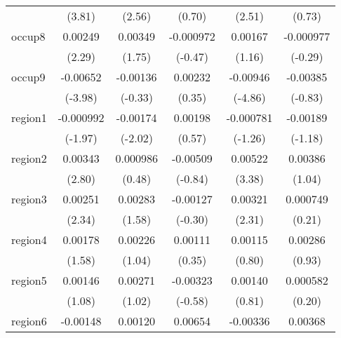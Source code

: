 \begin{table}[htbp]
\begin{tabular}{l*{5}{c}}
            &      (3.81)         &      (2.56)         &      (0.70)         &      (2.51)         &      (0.73)         \\
occup8      &     0.00249\sym{*}  &     0.00349         &   -0.000972         &     0.00167         &   -0.000977         \\
            &      (2.29)         &      (1.75)         &     (-0.47)         &      (1.16)         &     (-0.29)         \\
occup9      &    -0.00652\sym{***}&    -0.00136         &     0.00232         &    -0.00946\sym{***}&    -0.00385         \\
            &     (-3.98)         &     (-0.33)         &      (0.35)         &     (-4.86)         &     (-0.83)         \\
region1     &   -0.000992\sym{*}  &    -0.00174\sym{*}  &     0.00198         &   -0.000781         &    -0.00189         \\
            &     (-1.97)         &     (-2.02)         &      (0.57)         &     (-1.26)         &     (-1.18)         \\
region2     &     0.00343\sym{**} &    0.000986         &    -0.00509         &     0.00522\sym{***}&     0.00386         \\
            &      (2.80)         &      (0.48)         &     (-0.84)         &      (3.38)         &      (1.04)         \\
region3     &     0.00251\sym{*}  &     0.00283         &    -0.00127         &     0.00321\sym{*}  &    0.000749         \\
            &      (2.34)         &      (1.58)         &     (-0.30)         &      (2.31)         &      (0.21)         \\
region4     &     0.00178         &     0.00226         &     0.00111         &     0.00115         &     0.00286         \\
            &      (1.58)         &      (1.04)         &      (0.35)         &      (0.80)         &      (0.93)         \\
region5     &     0.00146         &     0.00271         &    -0.00323         &     0.00140         &    0.000582         \\
            &      (1.08)         &      (1.02)         &     (-0.58)         &      (0.81)         &      (0.20)         \\
region6     &    -0.00148         &     0.00120         &     0.00654         &    -0.00336\sym{**} &     0.00368         \\

\end{tabular}
\end{table}

